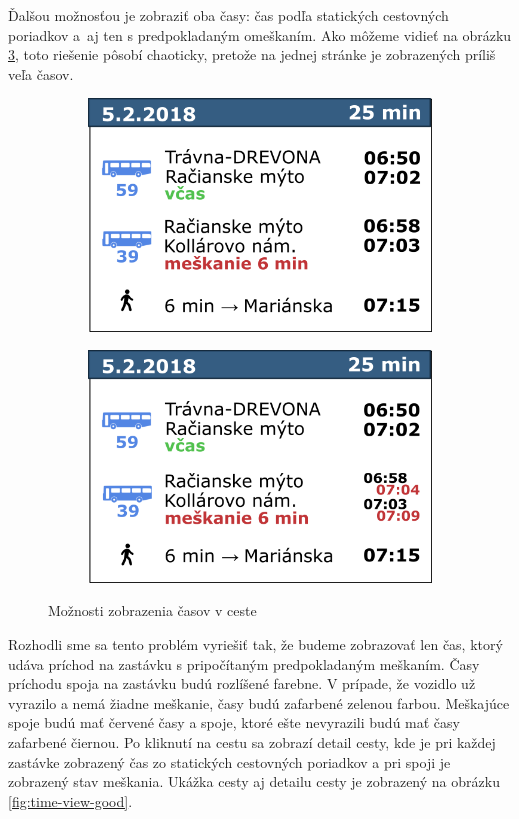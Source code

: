 Ďalšou možnosťou je zobraziť oba časy: čas podľa statických cestovných poriadkov a~aj ten s predpokladaným omeškaním. Ako môžeme vidieť na obrázku \ref{fig:time-view-bad2}, toto riešenie pôsobí chaoticky, pretože na jednej stránke je zobrazených príliš veľa časov. 

\begin{figure}[H]
\centering
	\begin{subfigure}[b]{0.48\textwidth}
		\centering
 		\includegraphics[width=0.7\linewidth]{images/time-view1}
		\caption{ }
		\label{fig:time-view-bad1}
	\end{subfigure}
	\begin{subfigure}[b]{0.48\textwidth}
		\centering
		\includegraphics[width=0.7\linewidth]{images/time-view2}
			\caption{ }
		\label{fig:time-view-bad2}
	\end{subfigure}
	\caption[Možnosti zobrazenia časov v ceste]{Možnosti zobrazenia časov v ceste}
\end{figure}

Rozhodli sme sa tento problém vyriešiť tak, že budeme zobrazovať len čas, ktorý udáva príchod na zastávku s pripočítaným predpokladaným meškaním. Časy príchodu spoja na zastávku budú rozlíšené farebne. V prípade, že vozidlo už vyrazilo a nemá žiadne meškanie, časy budú zafarbené zelenou farbou. Meškajúce spoje budú mať červené časy a spoje, ktoré ešte nevyrazili budú mať časy zafarbené čiernou. 
Po kliknutí na cestu sa zobrazí detail cesty, kde je pri každej zastávke zobrazený čas zo statických cestovných  poriadkov a pri spoji je zobrazený stav meškania. Ukážka cesty aj detailu cesty je zobrazený na obrázku \ref{fig:time-view-good}.


